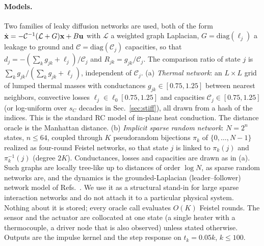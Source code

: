 \documentclass[aps,pra,superscriptaddress,floatfix,longbibliography,twocolumn]{revtex4-2}
\newcommand{\bx}{{\bf x}}
\newcommand{\bu}{{\bf u}}
\begin{document}
\paragraph*{Models.} Two families of leaky diffusion networks are used, both of the form $\dot\bx=-\mathcal{C}^{-1}(\mathcal{L}+G)\bx+B\bu$ with $\mathcal{L}$ a weighted graph Laplacian, $G=\mathrm{diag}(\ell_j)$ a leakage to ground and $\mathcal{C}=\mathrm{diag}(\mathcal{C}_j)$ capacities, so that $d_j=-(\sum_kg_{jk}+\ell_j)/\mathcal{C}_j$ and $R_{jk}=g_{jk}/\mathcal{C}_j$. The comparison ratio of state $j$ is $\sum_kg_{jk}/(\sum_kg_{jk}+\ell_j)$, independent of $\mathcal{C}_j$.
(a) \emph{Thermal network}: an $L\times L$ grid of lumped thermal masses with conductances $g_{jk}\in[0.75,1.25]$ between nearest neighbors, convective losses $\ell_j\in\ell_0[0.75,1.25]$ and capacities $\mathcal{C}_j\in[0.75,1.25]$ (or log-uniform over $s_C$ decades in Sec.~\ref{sec:stiff}), all drawn from a hash of the indices. This is the standard RC model of in-plane heat conduction. The distance oracle is the Manhattan distance.
(b) \emph{Implicit sparse random network}: $N=2^n$ states, $n\le64$, coupled through $K$ pseudorandom bijections $\pi_k$ of $\{0,\dots,N-1\}$ realized as four-round Feistel networks, so that state $j$ is linked to $\pi_k(j)$ and $\pi_k^{-1}(j)$ (degree $2K$). Conductances, losses and capacities are drawn as in (a). Such graphs are locally tree-like up to distances of order $\log N$, as sparse random networks are, and the dynamics is the grounded-Laplacian (leader--follower) network model of Refs.~\cite{mesbahi2010,pasqualetti2014}. We use it as a structural stand-in for large sparse interaction networks and do not attach it to a particular physical system. Nothing about it is stored; every oracle call evaluates $O(K)$ Feistel rounds.
The sensor and the actuator are collocated at one state (a single heater with a thermocouple, a driver node that is also observed) unless stated otherwise. Outputs are the impulse kernel and the step response on $t_k=0.05k$, $k\le100$.
\end{document}
